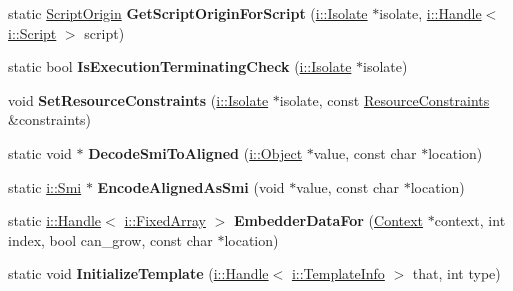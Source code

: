 \begin{DoxyCompactItemize}
\item 
static \hyperlink{classv8_1_1_script_origin}{Script\+Origin} {\bfseries Get\+Script\+Origin\+For\+Script} (\hyperlink{classv8_1_1internal_1_1_isolate}{i\+::\+Isolate} $\ast$isolate, \hyperlink{classv8_1_1internal_1_1_handle}{i\+::\+Handle}$<$ \hyperlink{classv8_1_1internal_1_1_script}{i\+::\+Script} $>$ script)\hypertarget{namespacev8_a026c8fe3464525812979a361db98cc4d}{}\label{namespacev8_a026c8fe3464525812979a361db98cc4d}

\item 
static bool {\bfseries Is\+Execution\+Terminating\+Check} (\hyperlink{classv8_1_1internal_1_1_isolate}{i\+::\+Isolate} $\ast$isolate)\hypertarget{namespacev8_aa4cb6cc5df25a97b91fbba1a3d399ab3}{}\label{namespacev8_aa4cb6cc5df25a97b91fbba1a3d399ab3}

\item 
void {\bfseries Set\+Resource\+Constraints} (\hyperlink{classv8_1_1internal_1_1_isolate}{i\+::\+Isolate} $\ast$isolate, const \hyperlink{classv8_1_1_resource_constraints}{Resource\+Constraints} \&constraints)\hypertarget{namespacev8_a43d53b7beaa27d6e70d2f7b834892630}{}\label{namespacev8_a43d53b7beaa27d6e70d2f7b834892630}

\item 
static void $\ast$ {\bfseries Decode\+Smi\+To\+Aligned} (\hyperlink{classv8_1_1internal_1_1_object}{i\+::\+Object} $\ast$value, const char $\ast$location)\hypertarget{namespacev8_af626dea1b3e68696a437649fcbe197d2}{}\label{namespacev8_af626dea1b3e68696a437649fcbe197d2}

\item 
static \hyperlink{classv8_1_1internal_1_1_smi}{i\+::\+Smi} $\ast$ {\bfseries Encode\+Aligned\+As\+Smi} (void $\ast$value, const char $\ast$location)\hypertarget{namespacev8_a4f86034db5a93b6cd11c46469ebeb3bd}{}\label{namespacev8_a4f86034db5a93b6cd11c46469ebeb3bd}

\item 
static \hyperlink{classv8_1_1internal_1_1_handle}{i\+::\+Handle}$<$ \hyperlink{classv8_1_1internal_1_1_fixed_array}{i\+::\+Fixed\+Array} $>$ {\bfseries Embedder\+Data\+For} (\hyperlink{classv8_1_1_context}{Context} $\ast$context, int index, bool can\+\_\+grow, const char $\ast$location)\hypertarget{namespacev8_a9def11feaf345c3a12c49975d99f86eb}{}\label{namespacev8_a9def11feaf345c3a12c49975d99f86eb}

\item 
static void {\bfseries Initialize\+Template} (\hyperlink{classv8_1_1internal_1_1_handle}{i\+::\+Handle}$<$ \hyperlink{classv8_1_1internal_1_1_template_info}{i\+::\+Template\+Info} $>$ that, int type)\hypertarget{namespacev8_a6e052336d7b1bbf19602bb736670aebe}{}\label{namespacev8_a6e052336d7b1bbf19602bb736670aebe}


\end{DoxyCompactItemize}
